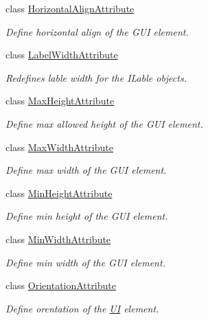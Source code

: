 \begin{DoxyCompactItemize}
class \mbox{\hyperlink{class_wpf_handler_1_1_u_i_1_1_auto_layout_1_1_options_1_1_horizontal_align_attribute}{Horizontal\+Align\+Attribute}}
\begin{DoxyCompactList}\small\item\em Define horizontal align of the G\+UI element. \end{DoxyCompactList}\item 
class \mbox{\hyperlink{class_wpf_handler_1_1_u_i_1_1_auto_layout_1_1_options_1_1_label_width_attribute}{Label\+Width\+Attribute}}
\begin{DoxyCompactList}\small\item\em Redefines lable width for the I\+Lable objects. \end{DoxyCompactList}\item 
class \mbox{\hyperlink{class_wpf_handler_1_1_u_i_1_1_auto_layout_1_1_options_1_1_max_height_attribute}{Max\+Height\+Attribute}}
\begin{DoxyCompactList}\small\item\em Define max allowed height of the G\+UI element. \end{DoxyCompactList}\item 
class \mbox{\hyperlink{class_wpf_handler_1_1_u_i_1_1_auto_layout_1_1_options_1_1_max_width_attribute}{Max\+Width\+Attribute}}
\begin{DoxyCompactList}\small\item\em Define max width of the G\+UI element. \end{DoxyCompactList}\item 
class \mbox{\hyperlink{class_wpf_handler_1_1_u_i_1_1_auto_layout_1_1_options_1_1_min_height_attribute}{Min\+Height\+Attribute}}
\begin{DoxyCompactList}\small\item\em Define min height of the G\+UI element. \end{DoxyCompactList}\item 
class \mbox{\hyperlink{class_wpf_handler_1_1_u_i_1_1_auto_layout_1_1_options_1_1_min_width_attribute}{Min\+Width\+Attribute}}
\begin{DoxyCompactList}\small\item\em Define min width of the G\+UI element. \end{DoxyCompactList}\item 
class \mbox{\hyperlink{class_wpf_handler_1_1_u_i_1_1_auto_layout_1_1_options_1_1_orientation_attribute}{Orientation\+Attribute}}
\begin{DoxyCompactList}\small\item\em Define orentation of the \mbox{\hyperlink{namespace_wpf_handler_1_1_u_i}{UI}} element. \end{DoxyCompactList}\item 

\end{DoxyCompactItemize}
